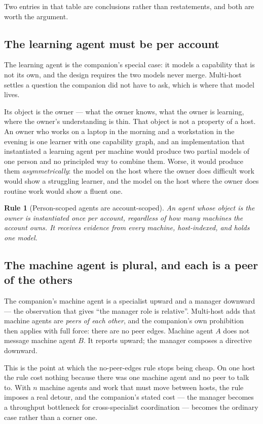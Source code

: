 \documentclass[11pt]{article}
\newtheorem{drule}{Rule}
\begin{document}
Two entries in that table are conclusions rather than restatements, and both are worth the argument.

\subsection{The learning agent must be per account}

The learning agent is the companion's special case: it models a capability that is not its own, and the design requires the two models never merge. Multi-host settles a question the companion did not have to ask, which is where that model lives.

Its object is the owner --- what the owner knows, what the owner is learning, where the owner's understanding is thin. That object is not a property of a host. An owner who works on a laptop in the morning and a workstation in the evening is one learner with one capability graph, and an implementation that instantiated a learning agent per machine would produce two partial models of one person and no principled way to combine them. Worse, it would produce them \emph{asymmetrically}: the model on the host where the owner does difficult work would show a struggling learner, and the model on the host where the owner does routine work would show a fluent one.

\begin{drule}[Person-scoped agents are account-scoped]
\label{rule:person}
An agent whose object is the owner is instantiated once per account, regardless of how many machines the account owns. It receives evidence from every machine, host-indexed, and holds one model.
\end{drule}

\subsection{The machine agent is plural, and each is a peer of the others}

The companion's machine agent is a specialist upward and a manager downward --- the observation that gives ``the manager role is relative''. Multi-host adds that machine agents are \emph{peers of each other}, and the companion's own prohibition then applies with full force: there are no peer edges. Machine agent $A$ does not message machine agent $B$. It reports upward; the manager composes a directive downward.

This is the point at which the no-peer-edges rule stops being cheap. On one host the rule cost nothing because there was one machine agent and no peer to talk to. With $n$ machine agents and work that must move between hosts, the rule imposes a real detour, and the companion's stated cost --- the manager becomes a throughput bottleneck for cross-specialist coordination --- becomes the ordinary case rather than a corner one.
\end{document}
